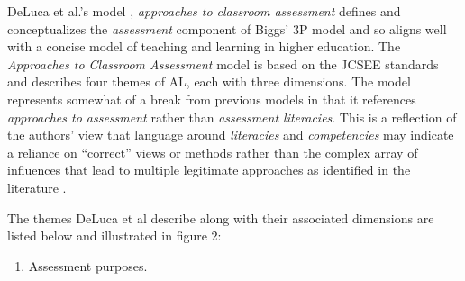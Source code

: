 \documentclass[
]{book}
\providecommand{\tightlist}{%
  \setlength{\itemsep}{0pt}\setlength{\parskip}{0pt}}
\begin{document}
DeLuca et al.'s model \citeyearpar{delucaApproachesClassroomAssessment2016}, \emph{approaches to classroom assessment} defines and conceptualizes the \emph{assessment} component of Biggs' 3P model \citetext{\citeyear{biggsWhatStudentDoes1999}; \citeyear{biggsTheoryPracticeCognitive1993}} and so aligns well with a concise model of teaching and learning in higher education. The \emph{Approaches to Classroom Assessment} model is based on the JCSEE standards \citep{klingerClassroomAssessmentStandards2015} and describes four themes of AL, each with three dimensions. The model represents somewhat of a break from previous models in that it references \emph{approaches to assessment} rather than \emph{assessment literacies}. This is a reflection of the authors' view that language around \emph{literacies} and \emph{competencies} may indicate a reliance on ``correct'' views or methods rather than the complex array of influences that lead to multiple legitimate approaches as identified in the literature \citep{delucaDifferentialSituatedView2019, willisConceptualisingTeachersAssessment2013}.

The themes DeLuca et al \citeyearpar[p.~10]{delucaExploringAssessmentCultures2021} describe along with their associated dimensions are listed below and illustrated in figure 2:

\begin{enumerate}
\def\labelenumi{\arabic{enumi}.}
\tightlist
\item
  Assessment purposes.\\
\end{enumerate}
\end{document}
